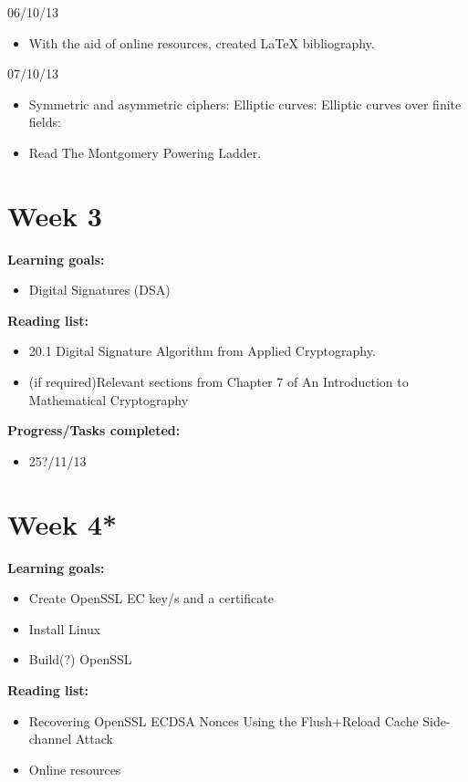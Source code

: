 \documentclass[a4paper, 10pt, envcountsect, runningheads]{article}
\begin{document}
06/10/13
\begin{itemize}
\item With the aid of online resources, created LaTeX bibliography. 
\end{itemize}

07/10/13
\begin{itemize}
\item Symmetric and asymmetric ciphers:
\newline Elliptic curves:
\newline Elliptic curves over finite fields:
\item Read The Montgomery Powering Ladder.
\end{itemize}


\newpage
\section*{Week 3}
\textbf{Learning goals:}
\begin{itemize}
\item Digital Signatures (DSA)
\end{itemize}

\textbf{Reading list:}
\begin{itemize}
\item 20.1 Digital Signature Algorithm from Applied Cryptography.
\item (if required)Relevant sections from Chapter 7 of An Introduction to Mathematical Cryptography
\end{itemize}

\textbf{Progress/Tasks completed:}
\begin{itemize}
\item 25?/11/13
\end{itemize}



\newpage
\section*{Week 4*}
\textbf{Learning goals:}
\begin{itemize}
\item Create OpenSSL EC key/s and a certificate
\item Install Linux
\item Build(?) OpenSSL
\end{itemize}

\textbf{Reading list:}
\begin{itemize}
\item Recovering OpenSSL ECDSA Nonces Using the Flush+Reload Cache Side-channel Attack
\item Online resources
\end{itemize}
\end{document}
